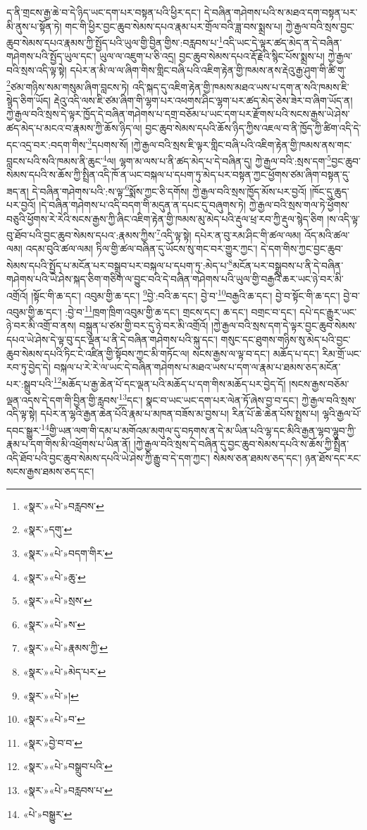 ད་ནི་གྲངས་རྒྱ་ཆེ་བ་དེ་ཉིད་ཡང་དག་པར་བསྟན་པའི་ཕྱིར་དང་། དེ་བཞིན་གཤེགས་པའི་ས་མཐའ་དག་བསྟན་པར་མི་ནུས་པ་སྟོན་ཏེ། གང་གི་ཕྱིར་བྱང་ཆུབ་སེམས་དཔའ་རྣམ་པར་གྲོལ་བའི་ཟླ་བས་སྨྲས་པ། ཀྱེ་རྒྱལ་བའི་སྲས་བྱང་ཆུབ་སེམས་དཔའ་རྣམས་ཀྱི་སྤྱོད་པའི་ཡུལ་གྱི་བྱིན་གྱིས་:བརླབས་པ་\footnote{«སྣར་»«པེ་»བརླབས་}འདི་ཡང་དེ་ལྟར་ཚད་མེད་ན་དེ་བཞིན་གཤེགས་པའི་སྤྱོད་ཡུལ་དང་། ཡུལ་ལ་འཇུག་པ་ཅི་འདྲ། བྱང་ཆུབ་སེམས་དཔའ་རྡོ་རྗེའི་སྙིང་པོས་སྨྲས་པ། ཀྱེ་རྒྱལ་བའི་སྲས་འདི་ལྟ་སྟེ། དཔེར་ན་མི་ལ་ལ་ཞིག་གིས་གླིང་བཞི་པའི་འཇིག་རྟེན་གྱི་ཁམས་ནས་རྡེའུ་རྒྱ་ཤུག་གི་ཚི་གུ་\footnote{«སྣར་»དགུ་}ཙམ་གཉིས་སམ་གསུམ་ཞིག་བླངས་ཏེ། འདི་སྐད་དུ་འཇིག་རྟེན་གྱི་ཁམས་མཐའ་ཡས་པ་དག་ན་སའི་ཁམས་ཇི་སྙེད་ཅིག་ཡོད། རྡེའུ་འདི་ལས་ཇི་ཙམ་ཞིག་གི་ལྷག་པར་འཕགས་ཤིང་ལྷག་པར་ཚད་མེད་ཅེས་ཟེར་བ་ཞིག་ཡོད་ན། ཀྱེ་རྒྱལ་བའི་སྲས་དེ་ལྟར་ཁྱོད་དེ་བཞིན་གཤེགས་པ་དགྲ་བཅོམ་པ་ཡང་དག་པར་རྫོགས་པའི་སངས་རྒྱས་ཡེ་ཤེས་ཚད་མེད་པ་མངའ་བ་རྣམས་ཀྱི་ཆོས་ཉིད་ལ། བྱང་ཆུབ་སེམས་དཔའི་ཆོས་ཉིད་ཀྱིས་འཇལ་བ་ནི་ཁྱོད་ཀྱི་ཚིག་འདི་དེ་དང་འདྲ་བར་:བདག་གིས་\footnote{«སྣར་»«པེ་»བདག་གིར་}དཔགས་སོ། །ཀྱེ་རྒྱལ་བའི་སྲས་ཇི་ལྟར་གླིང་བཞི་པའི་འཇིག་རྟེན་གྱི་ཁམས་ནས་གང་བླངས་པའི་སའི་ཁམས་ནི་ཆུང་\footnote{«སྣར་»«པེ་»ཆུ་}ལ། ལྷག་མ་ལས་པ་ནི་ཚད་མེད་པ་དེ་བཞིན་དུ། ཀྱེ་རྒྱལ་བའི་:སྲས་དག་\footnote{«སྣར་»«པེ་»སྲས་}བྱང་ཆུབ་སེམས་དཔའི་ས་ཆོས་ཀྱི་སྤྲིན་འདི་ཁོ་ན་ཡང་བསྐལ་པ་དཔག་ཏུ་མེད་པར་བསྟན་ཀྱང་ཕྱོགས་ཙམ་ཞིག་བསྟན་དུ་ཟད་ན། དེ་བཞིན་གཤེགས་པའི་:ས་ལྟ་\footnote{«སྣར་»«པེ་»ས་}སྨོས་ཀྱང་ཅི་དགོས། ཀྱེ་རྒྱལ་བའི་སྲས་ཁྱོད་མོས་པར་བྱའོ། །ཁོང་དུ་ཆུད་པར་བྱའོ། །དེ་བཞིན་གཤེགས་པ་འདི་བདག་གི་མདུན་ན་དཔང་དུ་བཞུགས་ཏེ། ཀྱེ་རྒྱལ་བའི་སྲས་གལ་ཏེ་ཕྱོགས་བཅུའི་ཕྱོགས་རེ་རེའི་སངས་རྒྱས་ཀྱི་ཞིང་འཇིག་རྟེན་གྱི་ཁམས་མུ་མེད་པའི་རྡུལ་ཕྲ་རབ་ཀྱི་རྡུལ་སྙེད་ཅིག །ས་འདི་ལྟ་བུ་ཐོབ་པའི་བྱང་ཆུབ་སེམས་དཔའ་:རྣམས་ཀྱིས་\footnote{«སྣར་»«པེ་»རྣམས་ཀྱི་}འདི་ལྟ་སྟེ། དཔེར་ན་བུ་རམ་ཤིང་གི་ཚལ་ལམ། འོད་མའི་ཚལ་ལམ། འདམ་བུའི་ཚལ་ལམ། ཏིལ་གྱི་ཚལ་བཞིན་དུ་ཡོངས་སུ་གང་བར་གྱུར་ཀྱང་། དེ་དག་གིས་ཀྱང་བྱང་ཆུབ་སེམས་དཔའི་སྤྱོད་པ་མངོན་པར་བསྒྲུབ་པར་བསྐལ་པ་དཔག་ཏུ་:མེད་པ་\footnote{«སྣར་»«པེ་»མེད་པར་}མངོན་པར་བསྒྲུབས་པ་ནི་དེ་བཞིན་གཤེགས་པའི་ཡེ་ཤེས་སྐད་ཅིག་གཅིག་ལ་བྱུང་བའི་དེ་བཞིན་གཤེགས་པའི་ཡུལ་གྱི་བརྒྱའི་ཆར་ཡང་ཉེ་བར་མི་འགྲོའོ། །སྟོང་གི་ཆ་དང་། འབུམ་གྱི་ཆ་དང་། \footnote{«སྣར་»«པེ་»།  }བྱེ་:བའི་ཆ་དང་། བྱེ་བ་\footnote{«སྣར་»«པེ་»བ་}བརྒྱའི་ཆ་དང་། བྱེ་བ་སྟོང་གི་ཆ་དང་། བྱེ་བ་འབུམ་གྱི་ཆ་དང་། :བྱེ་བ་\footnote{«སྣར་»བྱེ་བ་བ་}ཁྲག་ཁྲིག་འབུམ་གྱི་ཆ་དང་། གྲངས་དང་། ཆ་དང་། བགྲང་བ་དང་། དཔེ་དང་རྒྱུར་ཡང་ཉེ་བར་མི་འགྲོ་བ་ནས། བསྐྲུན་པ་ཙམ་གྱི་བར་དུ་ཉེ་བར་མི་འགྲོའོ། །ཀྱེ་རྒྱལ་བའི་སྲས་དག་དེ་ལྟར་བྱང་ཆུབ་སེམས་དཔའ་ཡེ་ཤེས་དེ་ལྟ་བུ་དང་ལྡན་པ་ནི་དེ་བཞིན་གཤེགས་པའི་སྐུ་དང་། གསུང་དང་ཐུགས་གཉིས་སུ་མེད་པའི་བྱང་ཆུབ་སེམས་དཔའི་ཏིང་ངེ་འཛིན་གྱི་སྟོབས་ཀྱང་མི་གཏོང་ལ། སངས་རྒྱས་ལ་ལྟ་བ་དང་། མཆོད་པ་དང་། རིམ་གྲོ་ཡང་རབ་ཏུ་བྱེད་དེ། བསྐལ་པ་རེ་རེ་ལ་ཡང་དེ་བཞིན་གཤེགས་པ་མཐའ་ཡས་པ་དག་ལ་རྣམ་པ་ཐམས་ཅད་མངོན་པར་:སྒྲུབ་པའི་\footnote{«སྣར་»«པེ་»བསྒྲུབ་པའི་}མཆོད་པ་རྒྱ་ཆེན་པོ་དང་ལྡན་པའི་མཆོད་པ་དག་གིས་མཆོད་པར་བྱེད་དོ། །སངས་རྒྱས་བཅོམ་ལྡན་འདས་དེ་དག་གི་བྱིན་གྱི་རླབས་\footnote{«སྣར་»«པེ་»བརླབས་པ་}དང་། སྣང་བ་ཡང་ཡང་དག་པར་ལེན་ཏོ་ཞེས་བྱ་བ་དང་། ཀྱེ་རྒྱལ་བའི་སྲས་འདི་ལྟ་སྟེ། དཔེར་ན་ལྷའི་རྒྱན་ཆེན་པོའི་རྣམ་པ་མཁན་བཟོས་མ་བྱས་པ། རིན་པོ་ཆེ་ཆེན་པོས་སྤྲས་པ། ལྷའི་རྒྱལ་པོ་དབང་སྒྱུར་\footnote{«པེ་»བསྒྱུར་}གྱི་ཡན་ལག་གི་དམ་པ་མགོའམ་མགུལ་དུ་བཏགས་ན་དེ་མ་ཡིན་པའི་ལྷ་དང་མིའི་རྒྱན་ལྷབ་ལྷུབ་ཀྱི་རྣམ་པ་དག་གིས་མི་འཕྲོགས་པ་ཡིན་ནོ། །ཀྱེ་རྒྱལ་བའི་སྲས་དེ་བཞིན་དུ་བྱང་ཆུབ་སེམས་དཔའི་ས་ཆོས་ཀྱི་སྤྲིན་འདི་ཐོབ་པའི་བྱང་ཆུབ་སེམས་དཔའི་ཡེ་ཤེས་ཀྱི་རྒྱུ་བ་དེ་དག་ཀྱང་། སེམས་ཅན་ཐམས་ཅད་དང་། ཉན་ཐོས་དང་རང་སངས་རྒྱས་ཐམས་ཅད་དང་། 